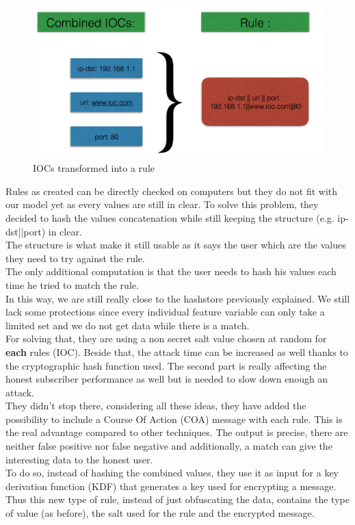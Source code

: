 \documentclass{eplmastersthesis}
\begin{document}
\begin{figure}[h!]
\begin{center}
	\includegraphics[scale=0.5]{res/ioc-rules}
	\caption{IOCs transformed into a rule}
	\label{IOC-To-Rule}
\end{center}
\end{figure}

Rules as created can be directly checked on computers but they do not fit with our model yet as every values are still in clear. To solve this problem, they decided to hash the values concatenation while still keeping the structure (e.g. ip-dst||port) in clear.\\
The structure is what make it still usable as it says the user which are the values they need to try against the rule.\\
The only additional computation is that the user needs to hash his values each time he tried to match the rule.\\
In this way, we are still really close to the hashstore previously explained. We still lack some protections since every individual feature variable can only take a limited set and we do not get data while there is a match.\\
For solving that, they are using a non secret salt value chosen at random for \textbf{each} rules (IOC). Beside that, the attack time can be increased as well thanks to the cryptographic hash function used. The second part is really affecting the honest subscriber performance as well but is needed to slow down enough an attack.\\

They didn't stop there, considering all these ideas, they have added the possibility to include a Course Of Action (COA) message with each rule. This is the real advantage compared to other techniques. The output is precise, there are neither false positive nor false negative and additionally, a match can give the interesting data to the honest user.\\ To do so, instead of hashing the combined values, they use it as input for a key derivation function (KDF) that generates a key used for encrypting a message.\\
Thus this new type of rule, instead of just obfuscating the data, contains the type of value (as before), the salt used for the rule and the encrypted message.\\
\end{document}
